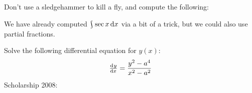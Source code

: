 \begin{questions}
  \clearpage
  \questioE Don't use a sledgehammer to kill a fly, and compute the following:
  \questioO We have already computed $ \rint \sec x \dif{x} $ via a bit of a trick, but we could also use partial fractions.
  \questioS Solve the following differential equation for $ y(x) $:
    \begin{displaymath}
      \od{y}{x} = \frac{y^2 - a^4}{x^2 - a^2}
    \end{displaymath}
  \questioS Scholarship 2008:
\end{questions}
